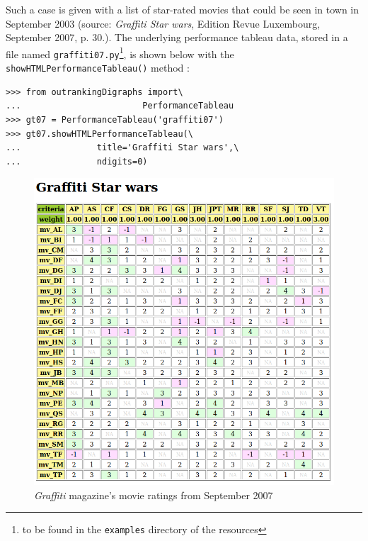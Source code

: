 Such a case is given with a list of star-rated movies that could be seen in town in September 2003 (source: \emph{Graffiti Star wars}, Edition Revue Luxembourg, September 2007, p. 30.). The underlying performance tableau data, stored in a file named \texttt{graffiti07.py}\footnote{to be found in the \texttt{examples} directory of the \Digraph resources}, is shown below with the \texttt{showHTMLPerformance\-Tableau()} method  : 
\begin{lstlisting}
>>> from outrankingDigraphs import\
...                        PerformanceTableau 
>>> gt07 = PerformanceTableau('graffiti07')
>>> gt07.showHTMLPerformanceTableau(\
...               title='Graffiti Star wars',\
...               ndigits=0)
\end{lstlisting}
\begin{figure}[ht]
\includegraphics[width=\hsize]{Figures/16-1-graffiti07_1.png}
\caption{\emph{Graffiti} magazine's movie ratings from September 2007}
\label{fig:16.1}       %
\end{figure}

